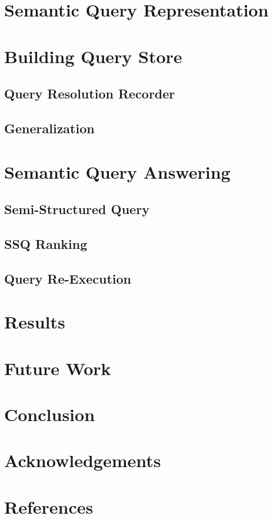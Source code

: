 \documentclass{www2010-submission}
\begin{document}
\section{Semantic Query Representation}

\section{Building Query Store}
\subsection{Query Resolution Recorder}
\subsection{Generalization}

\section{Semantic Query Answering}
\subsection{Semi-Structured Query}
\subsection{SSQ Ranking}
\subsection{Query Re-Execution}

\section{Results}

\section{Future Work}

\section{Conclusion}

\section{Acknowledgements}

\section{References}
\end{document}
